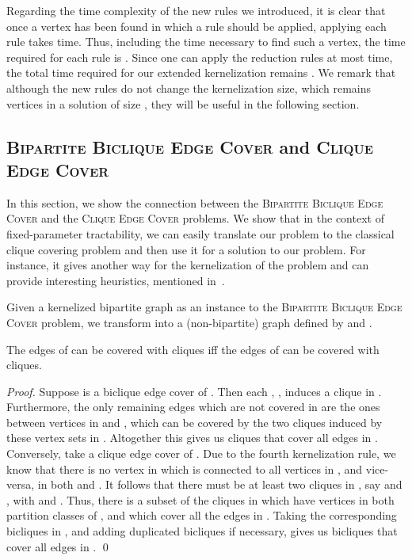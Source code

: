 Regarding the time complexity of the new rules we introduced,
it is clear that once a vertex has been found in which a rule
should be applied, applying each rule takes  time. Thus,
including the time necessary to find such a vertex, the time
required for each rule is . 
Since one can apply the
reduction rules at most  time, the total time required
for our extended kernelization remains . We remark that
although 
the new rules do not change the kernelization size, which
remains  vertices in a solution of size , they will be
useful in the following section.


\subsection{\textsc{Bipartite Biclique Edge Cover} and \textsc{Clique Edge Cover}}\label{s:ssrbeccec}

In this section, we show the connection between the \textsc{Bipartite Biclique
Edge Cover} and the \textsc{Clique Edge Cover} problems. We show that in the context of
fixed-parameter tractability, we can easily translate our problem to
the classical clique covering problem and then use it for a solution to our problem. For instance, it gives another way for the kernelization of the problem and can provide interesting heuristics, mentioned in~\cite{GrammGuoHuffnerNiedermeier2006}. 

Given a kernelized bipartite graph  as an instance to the
\textsc{Bipartite Biclique Edge Cover} problem, we transform
 into a (non-bipartite) graph  defined by 
and .

\begin{theorem}\label{t:qmqh}
The edges of  can be covered with  cliques iff the edges
of  can be covered with  cliques.
\end{theorem}

\begin{proof}
Suppose  is a biclique edge cover of . Then
each , , induces a clique in
. Furthermore, the only remaining edges which are not
covered in  are the ones between vertices in  and
, which can be covered by the two cliques induced by
these vertex sets in . Altogether this gives us 
cliques that cover all edges in . Conversely, take a clique
edge cover  of . Due to the fourth
kernelization rule, we know that there is no vertex in 
which is connected to all vertices in , and vice-versa,
in both  and . It follows that there must be at least
two cliques in , say  and , with
 and . Thus,
there is a subset of the cliques in  which
have vertices in both partition classes of , and which cover
all the edges in . Taking the corresponding bicliques in
, and adding duplicated bicliques if necessary, gives us  bicliques
that cover all edges in . \qed
\end{proof}




